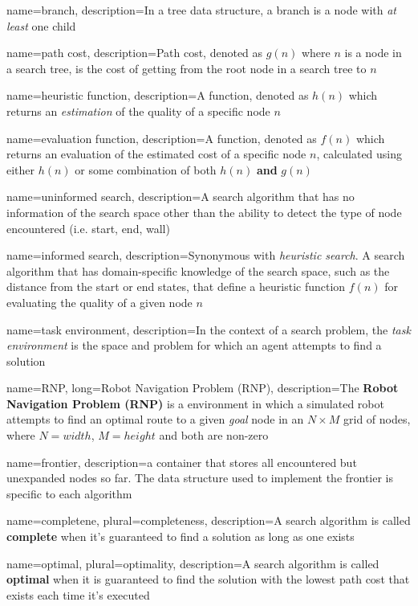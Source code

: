 {
	name=branch,
	description={In a \gls{tree} data structure, a branch is a \gls{node} with \textit{at least} one child}
}

{
	name={path cost},
	description={Path cost, denoted as $g(n)$ where $n$ is a node in a search tree, is the cost of getting from the root node in a search tree to $n$}
}

{
	name={heuristic function},
	description={A function, denoted as $h(n)$ which returns an \textit{estimation} of the quality of a specific node $n$}
}

{
	name={evaluation function},
	description={A function, denoted as $f(n)$ which returns an evaluation of the estimated cost of a specific node $n$, calculated using either $h(n)$ or some combination of both $h(n)$ \textbf{and} $g(n)$}
}

{
	name={uninformed search},
	description={A search algorithm that has no information of the search space other than the ability to detect the type of node encountered (i.e. start, end, wall)}
}

{
	name={informed search},
	description={Synonymous with \textit{heuristic search}. A search algorithm that has domain-specific knowledge of the search space, such as the distance from the start or end states, that define a \gls{heuristic} function $f(n)$ for evaluating the quality of a given node $n$}
}

{
	name={task environment},
	description={In the context of a search problem, the \textit{task environment} is the space and problem for which an agent attempts to find a solution}
}

{
	name={RNP},
	long={Robot Navigation Problem (RNP)},
	description={The \textbf{Robot Navigation Problem (RNP)} is a \Gls{environment} in which a simulated robot attempts to find an optimal route to a given \textit{goal} \gls{node} in an $N \times M$ grid of nodes, where $N=width$, $M=height$ and both are non-zero}
}

{
	name=frontier,
	description={a container that stores all encountered but unexpanded nodes so far. The data structure used to implement the frontier is specific to each algorithm}
}

{
	name=completene,
	plural=completeness,
	description={A search algorithm is called \textbf{complete} when it's guaranteed to find a solution as long as one exists}
}

{
	name=optimal,
	plural=optimality,
	description={A search algorithm is called \textbf{optimal} when it is guaranteed to find the solution with the lowest path cost that exists each time it's executed}
}
